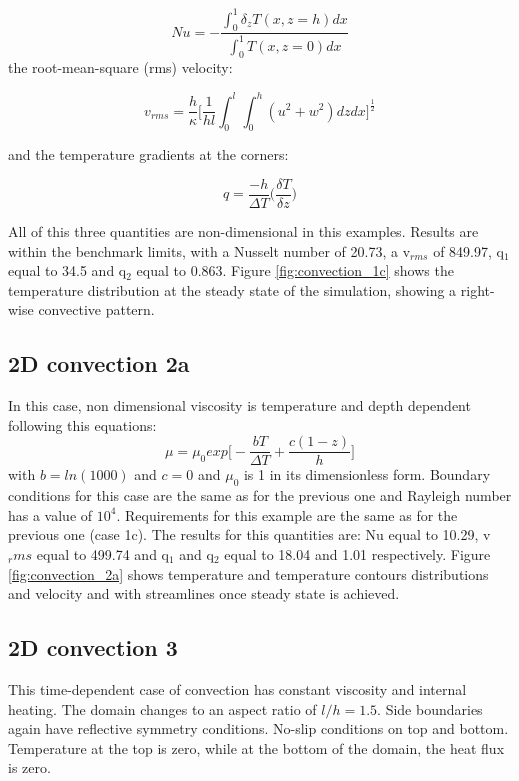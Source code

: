 \begin{equation}
	Nu = -\frac{\int_{0}^{1}\delta_zT(x,z=h)dx}{\int_{0}^{1}T(x,z=0)dx}
\end{equation}
the root-mean-square (rms) velocity:

\begin{equation}
	v_{rms} = \frac{h}{\kappa} \bigg[\frac{1}{hl}\int_{0}^{l}\int_{0}^{h}(u^2+w^2)dzdx\bigg]^{\frac{1}{2}}
\end{equation}

and the temperature gradients at the corners:

\begin{equation}
	q = \frac{-h}{\Delta T}\bigg(\frac{\delta T}{\delta z}\bigg)
\end{equation}

All of this three quantities are non-dimensional in this examples. Results are within the benchmark limits, with a Nusselt number of 20.73, a v$_{rms}$ of 849.97, q$_1$ equal to 34.5 and q$_2$ equal to 0.863.  
Figure \ref{fig:convection_1c} shows the temperature distribution at the steady state of the simulation, showing a right-wise convective pattern.


\subsection{2D convection 2a}
In this case, non dimensional viscosity is temperature and depth dependent following this equations:
\begin{equation}
	\mu = \mu_0 exp\bigg[-\frac{bT}{\Delta T} + \frac{c(1-z)}{h}\bigg]
\end{equation}
with $b = ln(1000)$ and $c = 0$ and $\mu_0$ is 1 in its dimensionless form. Boundary conditions for this case are the same as for the previous one and Rayleigh number has a value of $10^4$. Requirements for this example are the same as for the previous one (case 1c).
The results for this quantities are: Nu equal to 10.29, v$_rms$ equal to 499.74 and q$_1$ and q$_2$ equal to 18.04 and 1.01 respectively. 
Figure \ref{fig:convection_2a} shows temperature and temperature contours distributions and velocity and with streamlines once steady state is achieved. 

\subsection{2D convection 3}
This time-dependent case of convection has constant viscosity and internal heating. The domain changes to an aspect ratio of $l/h = 1.5$. Side boundaries again have reflective symmetry conditions. No-slip conditions on top and bottom. Temperature at the top is zero, while at the bottom of the domain, the heat flux is zero.


